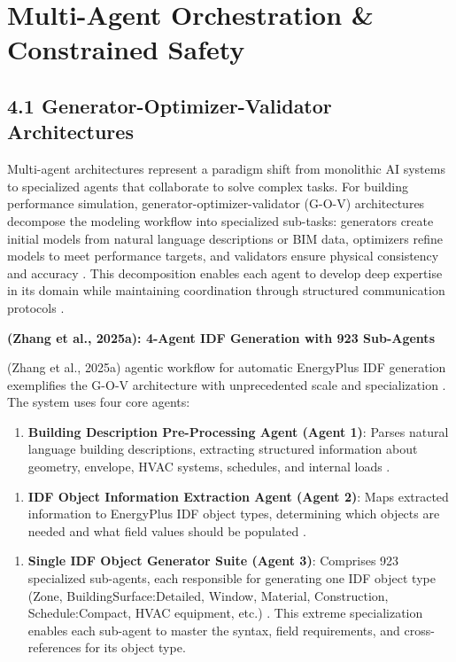 \documentclass[12pt,a4paper]{article}
\begin{document}
\section{Multi-Agent Orchestration \& Constrained Safety}

\subsection{4.1 Generator-Optimizer-Validator Architectures}

Multi-agent architectures represent a paradigm shift from monolithic AI systems to specialized agents that collaborate to solve complex tasks. For building performance simulation, generator-optimizer-validator (G-O-V) architectures decompose the modeling workflow into specialized sub-tasks: generators create initial models from natural language descriptions or BIM data, optimizers refine models to meet performance targets, and validators ensure physical consistency and accuracy \cite{ref124}. This decomposition enables each agent to develop deep expertise in its domain while maintaining coordination through structured communication protocols \cite{ref125}.

\textbf{(Zhang et al., 2025a): 4-Agent IDF Generation with 923 Sub-Agents}

(Zhang et al., 2025a) agentic workflow for automatic EnergyPlus IDF generation exemplifies the G-O-V architecture with unprecedented scale and specialization \cite{ref126}. The system uses four core agents:

\begin{enumerate}
  \item \textbf{Building Description Pre-Processing Agent (Agent 1)}: Parses natural language building descriptions, extracting structured information about geometry, envelope, HVAC systems, schedules, and internal loads \cite{ref127}.
\end{enumerate}

\begin{enumerate}
  \item \textbf{IDF Object Information Extraction Agent (Agent 2)}: Maps extracted information to EnergyPlus IDF object types, determining which objects are needed and what field values should be populated \cite{ref128}.
\end{enumerate}

\begin{enumerate}
  \item \textbf{Single IDF Object Generator Suite (Agent 3)}: Comprises 923 specialized sub-agents, each responsible for generating one IDF object type (Zone, BuildingSurface:Detailed, Window, Material, Construction, Schedule:Compact, HVAC equipment, etc.) \cite{ref129}. This extreme specialization enables each sub-agent to master the syntax, field requirements, and cross-references for its object type.
\end{enumerate}
\end{document}
